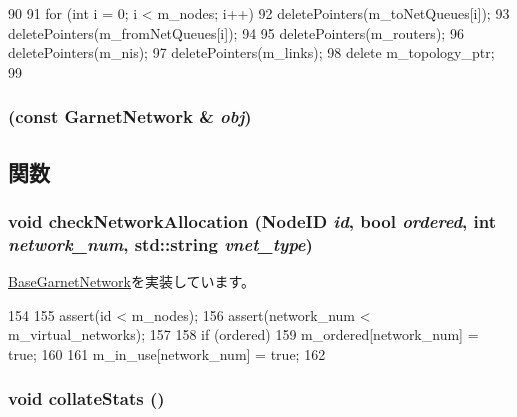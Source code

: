 \begin{DoxyCode}
90 {
91     for (int i = 0; i < m_nodes; i++) {
92         deletePointers(m_toNetQueues[i]);
93         deletePointers(m_fromNetQueues[i]);
94     }
95     deletePointers(m_routers);
96     deletePointers(m_nis);
97     deletePointers(m_links);
98     delete m_topology_ptr;
99 }
\end{DoxyCode}
\hypertarget{classGarnetNetwork_a6b14a1eb693d56b628d002eb6643696f}{
\subsubsection[{GarnetNetwork}]{ (const {\bf GarnetNetwork} \& {\em obj})}}
\label{classGarnetNetwork_a6b14a1eb693d56b628d002eb6643696f}


\subsection{関数}
\hypertarget{classGarnetNetwork_ad98444c4b69e4656dd10dc4ea3ad80dd}{
\subsubsection[{checkNetworkAllocation}]{\setlength{\rightskip}{0pt plus 5cm}void checkNetworkAllocation ({\bf NodeID} {\em id}, \/  bool {\em ordered}, \/  int {\em network\_\-num}, \/  std::string {\em vnet\_\-type})}}
\label{classGarnetNetwork_ad98444c4b69e4656dd10dc4ea3ad80dd}


\hyperlink{classBaseGarnetNetwork_a17adbaf838763d6fd04e9dbf53536b15}{BaseGarnetNetwork}を実装しています。


\begin{DoxyCode}
154 {
155     assert(id < m_nodes);
156     assert(network_num < m_virtual_networks);
157 
158     if (ordered) {
159         m_ordered[network_num] = true;
160     }
161     m_in_use[network_num] = true;
162 }
\end{DoxyCode}
\hypertarget{classGarnetNetwork_a208669cbc0bb1d52565956ca8c690c55}{
\subsubsection[{collateStats}]{\setlength{\rightskip}{0pt plus 5cm}void collateStats ()}}
\label{classGarnetNetwork_a208669cbc0bb1d52565956ca8c690c55}


